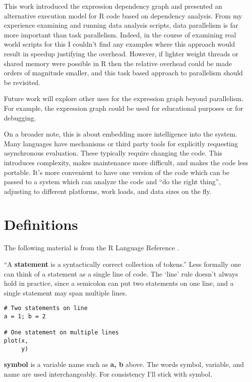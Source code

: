 \documentclass[12pt]{article}
\begin{document}
This work introduced the expression dependency graph and presented an
alternative execution model for R code based on dependency analysis.
From my experience examining and running data analysis scripts, 
data parallelism is far more important than task parallelism. Indeed, in
the course of examining real world scripts for this I couldn't find any
examples where this approach would result in speedup justifying the
overhead.  However, if lighter weight threads or shared memory were
possible in R then the relative overhead could be made orders of magnitude
smaller, and this task based approach to parallelism should be revisited.

Future work will explore other uses for the expression graph beyond
parallelism. For example, the expression graph could be used for
educational purposes or for debugging.

On a broader note, this is about embedding more intelligence into the 
system. Many languages have mechanisms or third party tools for explicitly
requesting asynchronous evaluation. These typically require changing the
code. This introduces complexity, makes maintenance more difficult, and
makes the code less portable.  It's more convenient to have one version of
the code which can be passed to a system which can analyze the code and
``do the right thing'', adjusting to different platforms, work loads, and
data sizes on the fly. 

\newpage
\appendix

\section{Definitions}

The following material is from the R Language Reference \cite{Rlang}.

``A \textbf{statement} is a
syntactically correct collection of tokens.'' Less formally one can think of
a statement as a single line of code. The `line' rule doesn't always hold in practice,
since a semicolon can put two statements on one line, and a single
statement may span multiple lines.

\begin{verbatim}
# Two statements on line
a = 1; b = 2

# One statement on multiple lines
plot(x,
     y)
\end{verbatim}

\textbf{symbol} is a variable name such as \textbf{a, b} above.  The words
symbol, variable, and name are used interchangeably. For consistency I'll
stick with symbol.
\end{document}
